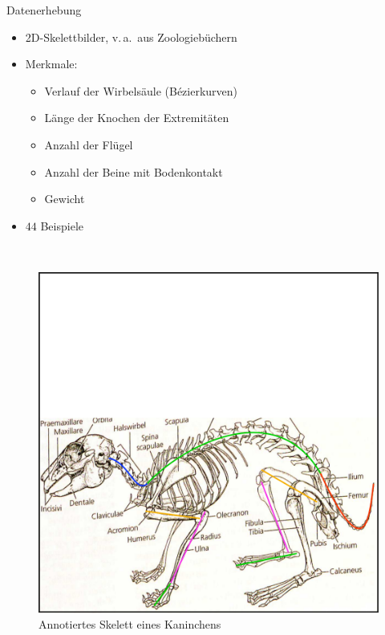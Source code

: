\documentclass{beamer}
\newcommand{\va}{v.\,a.\ }
\begin{document}
\begin{frame}{Datenerhebung}
 \begin{minipage}{0.5\textwidth}
  \begin{itemize}
   \item 2D-Skelettbilder, \va aus Zoologiebüchern
   \item Merkmale: 
   \begin{itemize}
    \item Verlauf der Wirbelsäule (Bézierkurven)
    \item Länge der Knochen der Extremitäten
    \item Anzahl der Flügel
    \item Anzahl der Beine mit Bodenkontakt
    \item Gewicht
   \end{itemize}
   \item $44$ Beispiele
  \end{itemize}
 \end{minipage}~
 \begin{minipage}{0.5\textwidth}
  \begin{figure}
  \centering
  \includegraphics[width=\textwidth]{../../PCA/Skelettbilder/Kaninchen_farbig.png}
  \caption{Annotiertes Skelett eines Kaninchens}
 \end{figure}
 \end{minipage}
\end{frame}
\end{document}
